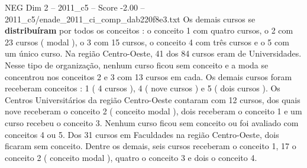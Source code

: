 \begin{textsample}{NEG Dim 2 – 2011\_c5 – Score -2.00 – 2011\_c5/enade\_2011\_ci\_comp\_dab220f8e3.txt}
Os demais cursos se \textbf{distribuíram} por todos os conceitos : o conceito 1 com quatro cursos, o 2 com 23 cursos ( modal ), o 3 com 15 cursos, o conceito 4 com três cursos e o 5 com um único curso.
Na região Centro-Oeste, 41 dos 84 cursos eram de Universidades.
Nesse tipo de organização, nenhum curso ficou sem conceito e a moda se concentrou nos conceitos 2 e 3 com 13 cursos em cada.
Os demais cursos foram receberam conceitos : 1 ( 4 cursos ), 4 ( nove cursos ) e 5 ( dois cursos ).
Os Centros Universitários da região Centro-Oeste contaram com 12 cursos, dos quais nove receberam o conceito 2 ( conceito modal ), dois receberam o conceito 1 e um curso recebeu o conceito 3.
Nenhum curso ficou sem conceito ou foi avaliado com conceitos 4 ou 5.
Dos 31 cursos em Faculdades na região Centro-Oeste, dois ficaram sem conceito.
Dentre os demais, seis cursos receberam o conceito 1, 17 o conceito 2 ( conceito modal ), quatro o conceito 3 e dois o conceito 4.

\end{textsample}

